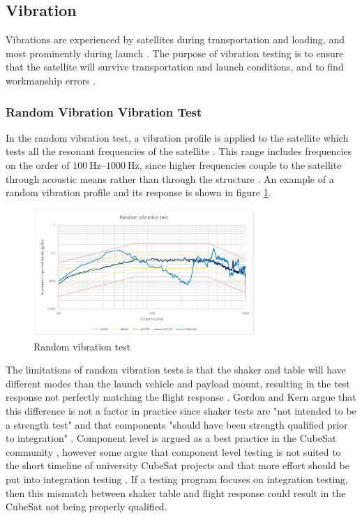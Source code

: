 \documentclass{report}
\begin{document}
\subsection{Vibration}
Vibrations are experienced by satellites during transportation and loading, and most prominently during launch \cite{brown_elements_2002}. The purpose of vibration testing is to ensure that the satellite will survive transportation and launch conditions, and to find workmanship errors \cite{brown_elements_2002,gordon2015benefits}.

\subsubsection{Random Vibration Vibration Test}
In the random vibration test, a vibration profile is applied to the satellite which tests all the resonant frequencies of the satellite \cite{nieto2019cubesat}. This range includes frequencies on the order of $\SIrange{100}{1000}{\hertz}$, since higher frequencies couple to the satellite through acoustic means rather than through the structure \cite{gordon2015benefits}. An example of a random vibration profile and its response is shown in figure \ref{fig:random}.

\begin{figure}[H]
  \centering
  \includegraphics[width=0.75\textwidth]{images/random-study.png}
  \caption{Random vibration test \cite{nieto2019cubesat}}
  \label{fig:random}
\end{figure}

The limitations of random vibration tests is that the shaker and table will have different modes than the launch vehicle and payload mount, resulting in the test response not perfectly matching the flight response \cite{gordon2015benefits,aglietti2019spacecraft}. Gordon and Kern argue that this difference is not a factor in practice since shaker tests are "not intended to be a strength test"  \cite[p.~7]{gordon2015benefits} and that components "should have been strength qualified prior to integration" \cite[p.~7]{gordon2015benefits}. Component level is argued as a best practice in the CubeSat community \cite{rawsonbest}, however some argue that component level testing is not suited to the short timeline of university CubeSat projects and that more effort should be put into integration testing \cite{decker2016systems}. If a testing program focuses on integration testing, then this mismatch between shaker table and flight response could result in the CubeSat not being properly qualified.
\end{document}
